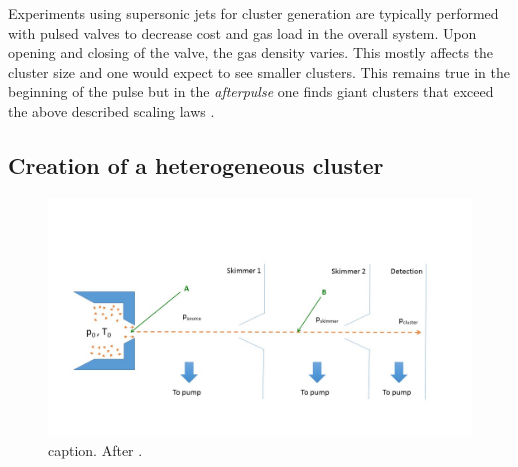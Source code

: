 Experiments using supersonic jets for cluster generation are typically performed with pulsed valves to decrease cost and gas load in the overall system. Upon opening and closing of the valve, the gas density varies. This mostly affects the cluster size and one would expect to see smaller clusters. This remains true in the beginning of the pulse but in the \textit{afterpulse} one finds giant clusters that exceed the above described scaling laws \cite{Rupp-2014-JCP}.
%
%
%
%
%
\subsection{Creation of a heterogeneous cluster}
\begin{figure}
	\centering
		\includegraphics[width=1.00\textwidth]{images/pick-up.jpg}
	\caption{caption. After \cite{Gough-1985-JChemPhys,Haberland-1994-Springer}.}
	\label{fig:pickupPrinciple}
\end{figure}
